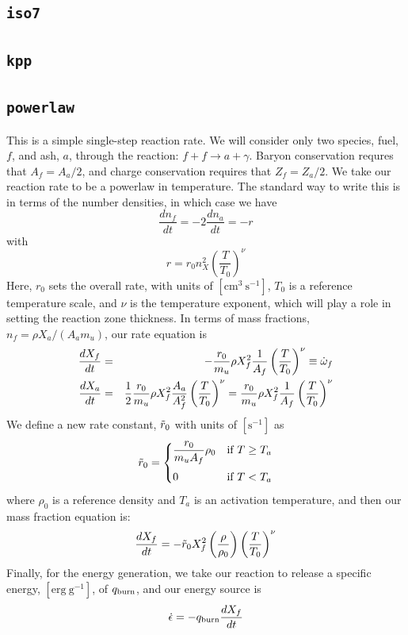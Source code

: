 \subsection{{\tt iso7}}


\subsection{{\tt kpp}}


\subsection{{\tt powerlaw}}

This is a simple single-step reaction rate.
We will consider only two species, fuel, $f$, and ash, $a$, through
the reaction: $f + f \rightarrow a + \gamma$.  Baryon conservation
requres that $A_f = A_a/2$, and charge conservation requires that $Z_f
= Z_a/2$.  We take
our reaction rate to be a powerlaw in temperature.  The standard way
to write this is in terms of the number densities, in which case we
have
\begin{equation}
\frac{d n_f}{d t} = -2\frac{d n_a}{d t} = -r
\end{equation}
with
\begin{equation}
  r = r_0 n_X^2 \left( \frac{T}{T_0} \right )^\nu
\end{equation}
Here, $r_0$ sets the overall rate, with units of
$[\mathrm{cm^3~s^{-1}}]$, $T_0$ is a reference temperature scale, and
$\nu$ is the temperature exponent, which will play a role in setting
the reaction zone thickness.  In terms of mass fractions, $n_f = \rho
X_a / (A_a m_u)$, our rate equation is
\begin{eqnarray}
 \frac{dX_f}{dt} &=& - \frac{r_0}{m_u} \rho X_f^2 \frac{1}{A_f} \left (\frac{T}{T_0}\right)^\nu \equiv \dot\omega_f \label{eq:Xf} \\
 \frac{dX_a}{dt} &=& \frac{1}{2}\frac{r_0}{m_u} \rho X_f^2 \frac{A_a}{A_f^2} \left (\frac{T}{T_0}\right)^\nu = \frac{r_0}{m_u} \rho X_f^2 \frac{1}{A_f} \left (\frac{T}{T_0}\right)^\nu  \label{eq:Xa}
\end{eqnarray}
We define a new rate constant, $\tilde{r}_0$ with units of $[\mathrm{s^{-1}}]$ as
\begin{equation}
\tilde{r}_0 =  \begin{cases}
  \dfrac{r_0}{m_u A_f} \rho_0 & \text{if $T \ge T_a$} \\[1em]
  0                          & \text{if $T < T_a$}
 \end{cases}
\end{equation}
where $\rho_0$ is a reference density and $T_a$ is an activation
temperature, and then our mass fraction equation is:
\begin{equation}
\frac{dX_f}{dt} = -\tilde{r}_0 X_f^2 \left (\frac{\rho}{\rho_0} \right ) \left ( \frac{T}{T_0}\right )^\nu
\end{equation}
Finally, for the
energy generation, we take our reaction to release a specific energy,
$[\mathrm{erg~g^{-1}}]$, of $q_\mathrm{burn}$, and our energy source is
\begin{equation}
\dot{\epsilon} = -q_\mathrm{burn} \frac{dX_f}{dt}
\end{equation}


